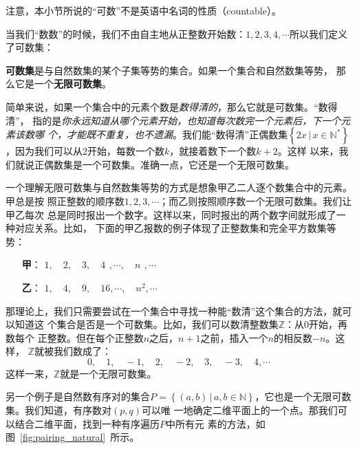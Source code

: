 注意，本小节所说的“可数”不是英语中名词的性质（countable）。

当我们“数数”的时候，我们不由自主地从正整数开始数：$1,2,3,4,\cdots $所以我们定义
了可数集：

\begin{rawdef}[可数集]
    \textbf{可数集}是与自然数集的某个子集等势的集合。如果一个集合和自然数集等势，
    那么它是一个\textbf{无限可数集}。
\end{rawdef}

简单来说，如果一个集合中的元素个数是\emph{数得清的}，那么它就是可数集。“数得清”，
指的是\emph{你永远知道从哪个元素开始，也知道每次数完一个元素后，下一个元素该数哪
个，才能既不重复，也不遗漏}。我们能“数得清”正偶数集$\left\{ 2x\,|\,x\in\mathbb{N}
^\ast\right\} $，因为我们可以从2开始，每数一个数$k$，就接着数下一个数$k+2$。这样
以来，我们就说正偶数集是一个可数集。准确一点，它还是一个无限可数集。

一个理解无限可数集与自然数集等势的方式是想象甲乙二人逐个数集合中的元素。甲总是按
照正整数的顺序数$1,2,3,\cdots $；而乙则按照顺序数一个无限可数集。我们让甲乙每次
总是同时报出一个数字。这样以来，同时报出的两个数字间就形成了一种对应关系。比如，
下面的甲乙报数的例子体现了正整数集和完全平方数集等势：

\vspace{2ex}
\begin{minipage}{20em}
    \begin{itemize}
        \item[\textbf{甲}：] $1,\quad 2,\quad 3,\quad 4\,\ , \cdots,\quad n\,\ , \cdots$
        \item[\textbf{乙}：] $1,\quad 4,\quad 9,\quad 16, \cdots,\quad n^2, \cdots$
    \end{itemize}
\end{minipage}
\vspace{2ex}

那理论上，我们只需要尝试在一个集合中寻找一种能“数清”这个集合的方法，就可以知道这
个集合是否是一个可数集。比如，我们可以数清整数集$\mathbb{Z}$：从0开始，再数每个
正整数。但在每个正整数$n$之后，$n+1$之前，插入一个$n$的相反数$-n$。这样，
$\mathbb{Z}$就被我们数成了：
\[
    0,\quad 1,\quad -1,\quad 2,\quad -2,\quad 3,\quad -3,\quad 4,\cdots
\]
这样一来，$\mathbb{Z}$就是一个无限可数集。

另一个例子是自然数有序对的集合$P=\left\{ \left( a,b \right) \,|\, a,b\in\mathbb{N} 
\right\} $，它也是一个无限可数集。我们知道，有序数对$\left( p,q \right) $可以唯
一地确定二维平面上的一个点。那我们可以结合二维平面，找到一种有序遍历$P$中所有元
素的方法，如图~\ref{fig:pairing_natural}~所示。

